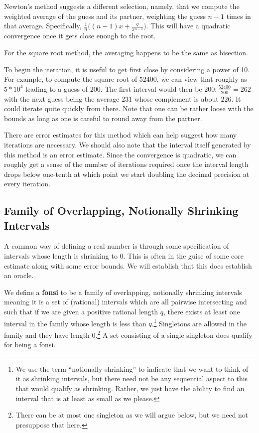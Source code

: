\documentclass[12pt]{article}
\theoremstyle{remark}
\begin{document}
Newton's method suggests a different selection, namely, that we compute the weighted average of the guess and its partner, weighting the guess $n-1$ times in that average. Specifically, $\frac{1}{n} \big( (n-1) x + \frac{q}{x^{n-1}} \big)$. This will have a quadratic convergence once it gets close enough to the root.

For the square root method, the averaging happens to be the same as bisection. 

To begin the iteration, it is useful to get first close by considering a power of 10. For example, to compute the square root of $52400$, we can view that roughly as $5*10^4$ leading to a guess of $200$. The first interval would then be $200: \frac{52400}{200} = 262$ with the next guess being the average $231$ whose complement is about $226$. It could iterate quite quickly from there. Note that one can be rather loose with the bounds as long as one is careful to round away from the partner.  

There are error estimates for this method which can help suggest how many iterations are necessary. We should also note that the interval itself generated by this method is an error estimate. Since the convergence is quadratic, we can roughly get a sense of the number of iterations required once the interval length drops below one-tenth at which point we start doubling the decimal precision at every iteration.  

\subsection{Family of Overlapping, Notionally Shrinking Intervals} \label{sec:ni}

A common way of defining a real number is through some specification of intervals whose length is shrinking to 0. This is often in the guise of some core estimate along with some error bounds. We will establish that this does establish an oracle. 

We define a \textbf{fonsi} to be a family of overlapping, notionally shrinking intervals meaning it is a set of (rational) intervals which are all pairwise intersecting and such that if we are given a positive rational length $q$, there exists at least one interval in the family whose length is less than $q$.\footnote{We use the term ``notionally shrinking'' to indicate that we want to think of it as shrinking intervals, but there need not be any sequential aspect to this that would qualify as shrinking. Rather, we just have the ability to find an interval that is at least as small as we please.} Singletons are allowed in the family and they have length 0.\footnote{There can be at most one singleton as we will argue below, but we need not presuppose that here.} A set consisting of a single singleton does qualify for being a fonsi.
\end{document}
